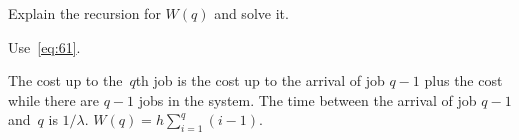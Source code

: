 \documentclass[queueing-book.tex]{subfiles}
\begin{document}
\begin{exercise}\label{ex:nmm-4}
Explain the  recursion for $W(q)$ and solve it.
\begin{hint}
  Use~\cref{eq:61}.
\end{hint}
\begin{solution}
  The cost up to the~$q$th job is the cost up to the arrival of job $q-1$ plus the cost while there are $q-1$ jobs in the system.
  The time between the arrival of job $q-1$ and~$q$ is $1/\lambda$.  $W(q) = h\sum_{i=1}^q (i-1)$.
\end{solution}
\end{exercise}


\end{document}
